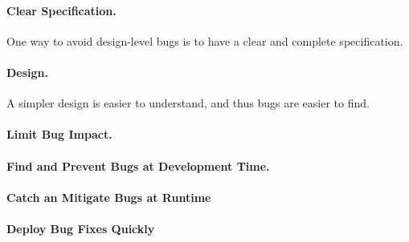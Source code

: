 \paragraph{Clear Specification.} One way to avoid design-level bugs is to have a clear and complete specification.

\paragraph{Design.} A simpler design is easier to understand, and thus bugs are easier to find.

\paragraph{Limit Bug Impact.} 

\paragraph{Find and Prevent Bugs at Development Time.}

\paragraph{Catch an Mitigate Bugs at Runtime}

\paragraph{Deploy Bug Fixes Quickly}
